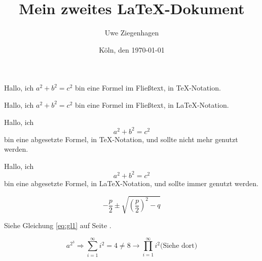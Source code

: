 \documentclass[12pt,ngerman,parskip=half]{scrartcl}
\author{Uwe Ziegenhagen}
\title{Mein zweites \LaTeX-Dokument}
\date{Köln, den \today}
\begin{document}
Hallo, ich $a^2+b^2=c^2$ bin eine Formel im Fließtext, in \TeX-Notation.

Hallo, ich \(a^2+b^2=c^2\) bin eine Formel im Fließtext, in \LaTeX-Notation.

Hallo, ich $$a^2+b^2=c^2$$ bin eine abgesetzte Formel, in \TeX-Notation, und sollte nicht mehr genutzt werden.

Hallo, ich \[a^2+b^2=c^2\] bin eine abgesetzte Formel, in \LaTeX-Notation, und sollte immer genutzt werden.

\begin{equation}\label{eq:gl1}%
-\frac{p}{2} \pm \sqrt{
\left(\frac{p}{2}\right)
^2 - q}
\end{equation}

Siehe Gleichung \ref{eq:gl1} auf Seite \pageref{eq:gl1}.

\begin{equation}
a^{2^3} \Rightarrow \sum_{i=1}^{\infty} i^2 = 4 \not=8 \rightarrow \prod_{i=1}^{\infty} i^2 \mbox{(Siehe dort)}
\end{equation}
\end{document}
